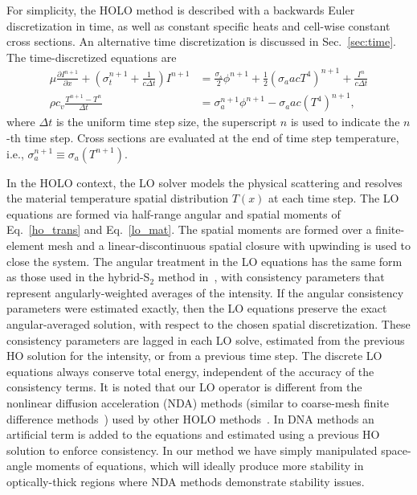 \documentclass[11pt]{article}
\newcommand{\pderiv}[2]{\frac{\partial #1}{\partial #2}}
\begin{document}
For simplicity, the HOLO method is described with a backwards Euler discretization in time, as
well as constant specific heats and cell-wise constant cross sections. An alternative
time discretization is discussed in Sec.~\ref{sec:time}. The time-discretized
equations are
\begin{align}
    \mu \pderiv{I^{n+1}}{x} + \left(\sigma_t^{n+1} + \frac{1}{c \Delta t }\right) I^{n+1}
&= \frac{\sigma_s}{2} \phi^{n+1} +\frac{1}{2} \left(\sigma_a a c T^4 \right)^{n+1} + \frac{I^n}{c \Delta t} \label{ho_trans} \\
\rho c_v \frac{T^{n+1} - T^n}{\Delta t} &= \sigma_a^{n+1} \phi^{n+1}
- \sigma_a a c (T^4)^{n+1} \label{lo_mat},
\end{align}
where $\Delta t$ is the uniform time step size, the superscript $n$ is used to indicate
the $n$-th time step. Cross sections are evaluated at the end of time step
temperature, i.e., $\sigma_a^{n+1}\equiv\sigma_a(T^{n+1})$.   

In the HOLO context, the LO solver models the physical scattering and
resolves the material temperature spatial distribution $T(x)$ at each time step.  The LO equations are formed via half-range 
angular and spatial moments of
Eq.~\eqref{ho_trans} and Eq.~\eqref{lo_mat}. The spatial moments are formed over a
finite-element
mesh and a linear-discontinuous spatial closure with upwinding is used to close the
system.  The angular treatment in the LO equations has the same form as those used in the
hybrid-S$_2$ method in~\cite{wolters},  with
consistency parameters that represent angularly-weighted averages of the intensity.
If the angular consistency parameters were estimated exactly, then
the LO equations preserve the exact angular-averaged solution,  with respect to the chosen
spatial discretization.  These consistency parameters are lagged in each LO solve,
estimated from the previous HO solution for the intensity, or from a previous time
step.  The discrete LO equations always conserve total energy, independent of the accuracy of the consistency terms.
It is noted that our LO operator is different from the nonlinear
diffusion acceleration (NDA) methods (similar to coarse-mesh finite difference
methods~\cite{cmfd}) used by other HOLO methods~\cite{rmc,park,willert}.  In
DNA methods an artificial term is added to the equations and estimated using a
previous HO solution to enforce consistency.  In our method we have simply
manipulated space-angle moments of equations, which will ideally produce more
stability in optically-thick regions where NDA methods demonstrate stability issues.
\end{document}
